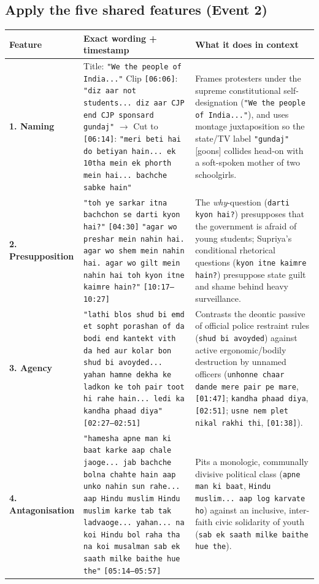 \documentclass[10pt,a4paper]{article}
\begin{document}
\subsection*{Apply the five shared features (Event 2)}
\begin{longtable}{@{}>{\raggedright\arraybackslash}p{} >{\raggedright\arraybackslash}p{} >{\raggedright\arraybackslash}p{}@{}}
\toprule
\textbf{Feature} & \textbf{Exact wording + timestamp} & \textbf{What it does in context} \\
\midrule
\endhead
\textbf{1. Naming} & Title: \texttt{"We the people of India..."} \newline  Clip \texttt{[06:06]}: \texttt{"diz aar not students... diz aar CJP end CJP sponsard gundaj"} $\rightarrow$ Cut to \texttt{[06:14]}: \texttt{"meri beti hai do betiyan hain... ek 10tha mein ek phorth mein hai... bachche sabke hain"} & Frames protesters under the supreme constitutional self-designation (\texttt{"We the people of India..."}), and uses montage juxtaposition so the state/TV label \texttt{"gundaj"} [goons] collides head-on with a soft-spoken mother of two schoolgirls. \\
\addlinespace[4pt]
\textbf{2. Presupposition} & \texttt{"toh ye sarkar itna bachchon se darti kyon hai?"} \texttt{[04:30]} \newline  \texttt{"agar wo preshar mein nahin hai. agar wo shem mein nahin hai. agar wo gilt mein nahin hai toh kyon itne kaimre hain?"} \texttt{[10:17--10:27]} & The \textit{why}-question (\texttt{darti kyon hai?}) presupposes that the government is afraid of young students; Supriya's conditional rhetorical questions (\texttt{kyon itne kaimre hain?}) presuppose state guilt and shame behind heavy surveillance. \\
\addlinespace[4pt]
\textbf{3. Agency} & \texttt{"lathi blos shud bi emd et sopht porashan of da bodi end kantekt vith da hed aur kolar bon shud bi avoyded... yahan hamne dekha ke ladkon ke toh pair toot hi rahe hain... ledi ka kandha phaad diya"} \texttt{[02:27--02:51]} & Contrasts the deontic passive of official police restraint rules (\texttt{shud bi avoyded}) against active ergonomic/bodily destruction by unnamed officers (\texttt{unhonne chaar dande mere pair pe mare}, \texttt{[01:47]}; \texttt{kandha phaad diya}, \texttt{[02:51]}; \texttt{usne nem plet nikal rakhi thi}, \texttt{[01:38]}). \\
\addlinespace[4pt]
\textbf{4. Antagonisation} & \texttt{"hamesha apne man ki baat karke aap chale jaoge... jab bachche bolna chahte hain aap unko nahin sun rahe... aap Hindu muslim Hindu muslim karke tab tak ladvaoge... yahan... na koi Hindu bol raha tha na koi musalman sab ek saath milke baithe hue the"} \texttt{[05:14--05:57]} & Pits a monologic, communally divisive political class (\texttt{apne man ki baat}, \texttt{Hindu muslim... aap log karvate ho}) against an inclusive, inter-faith civic solidarity of youth (\texttt{sab ek saath milke baithe hue the}). \\

\end{longtable}
\end{document}
